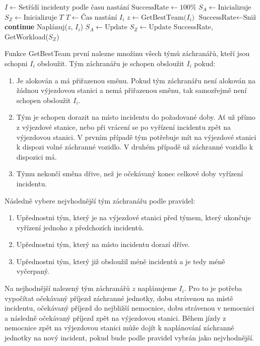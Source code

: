 \clearpage

\begin{algorithmic}[1]  %
	\State $I \gets \mbox{Setřídí incidenty podle času nastání}$
	\State $\text{SuccessRate} \gets 100\%$
	\State $S_A \gets \mbox{Inicializuje}$
	\State $S_Z \gets \mbox{Inicializuje}$
  \State $T$ 
    \State $T \gets \mbox{Čas nastání $I_i$}$
    \State $z \gets \mbox{GetBestTeam($I_i$)}$
      \State $\text{SuccessRate} \gets \mbox{Sniž}$
      \State \textbf{continue}
    \EndIf
    \State Naplánuj($z$, $I_i$)
    \State $S_A \gets \mbox{Update}$
    \State $S_Z \gets \mbox{Update}$
  \EndFor
  \State \Return SuccessRate, GetWorkload($S_Z$)
\EndFunction
\end{algorithmic}

\vspace*{25px}

Funkce GetBestTeam první nalezne množinu všech týmů záchranářů, kteří jsou schopni $I_i$ obsloužit.
Tým záchranářu je schopen obsloužit $I_i$ pokud:

\begin{enumerate}
  \item Je alokován a má přiřazenou směnu. Pokud tým záchranářu není alokován na žádnou výjezdovou stanici a nemá přiřazenou směnu, tak samozřejmě není schopen obsloužit $I_i$.
  \item Tým je schopen dorazit na místo incidentu do požadované doby. Ať už přímo z výjezdové stanice, nebo při vrácení se po vyřízení incidentu zpět na výjezdovou stanici. 
    V prvním případě tým potřebuje mít na výjezdové stanici k dispozi volné záchranné vozidlo. V druhém případě už záchranné vozidlo k dispozici má.
  \item Týmu nekončí směna dřive, než je očekávaný konec celkové doby vyřízení incidentu.
\end{enumerate}

Následně vybere nejvhodnější tým záchranářu podle pravidel:

\begin{enumerate}
  \item Upřednostni tým, který je na výjezdové stanici před týmem, který ukončuje vyřízení jednoho z předchozích incidentů. 
  \item Upřednostni tým, který na místo incidentu dorazí dříve. 
  \item Upřednostni tým, který již obsloužil méně incidentů a je tedy méně vyčerpaný.
\end{enumerate}

Na nejhodnější nalezený tým záchranářů $z$ naplánujeme $I_i$. Pro to je potřeba vypočítat očekávaný příjezd záchranné jednotky, dobu strávenou na místě incidentu, očekávaný příjezd
do nejbližší nemocnice, dobu strávenou v nemocnici a následně očekávaný příjezd zpět na výjezdovou stanici.
Během jízdy z nemocnice zpět na výjezdovou stanici může dojít k naplánování záchranné jednotky na nový incident, pokud bude podle pravidel vybrán jako nejvhodnější.



